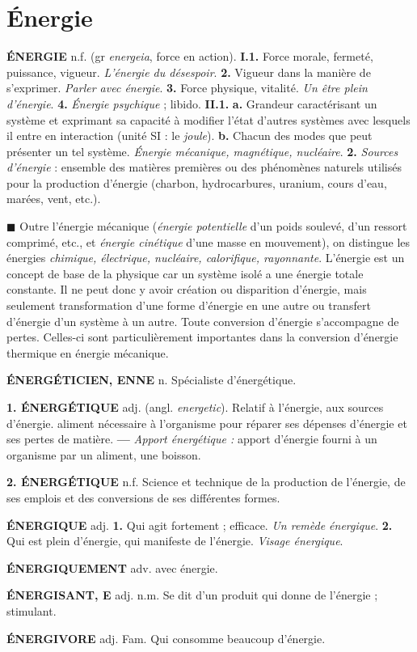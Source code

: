 \section{Énergie}

{\bf ÉNERGIE} {\sf n.f.} (gr {\it energeia}, force en action). {\bf I.1.} Force morale, fermeté, puissance, vigueur. {\it L'énergie du désespoir}. {\bf 2.} Vigueur dans la manière de s'exprimer. {\it Parler avec énergie}. {\bf 3.} Force physique, vitalité. {\it Un être plein d'énergie}. {\bf 4.}  {\it Énergie psychique} ; libido. {\bf II.1.}  {\bf a.} Grandeur caractérisant un système et exprimant sa capacité à modifier l'état d'autres systèmes avec lesquels il entre en interaction (unité SI : le {\it joule}). {\bf b.} Chacun des modes que peut présenter un tel système. {\it Énergie mécanique, magnétique, nucléaire}. {\bf 2.} {\it Sources d'énergie} : ensemble des matières premières ou des phénomènes naturels utilisés pour la production d'énergie (charbon, hydrocarbures, uranium, cours d'eau, marées, vent, etc.).

$\blacksquare$ Outre l'énergie mécanique ({\it énergie potentielle} d'un poids soulevé, d'un ressort comprimé, etc., et {\it énergie cinétique} d'une masse en mouvement), on distingue les énergies {\it chimique, électrique, nucléaire, calorifique, rayonnante}. L'énergie est un concept de base de la physique car un système isolé a une énergie totale constante. Il ne peut donc y avoir création ou disparition d'énergie, mais seulement transformation d'une forme d'énergie en une autre ou transfert d'énergie d'un système à un autre. Toute conversion d'énergie s'accompagne de pertes. Celles-ci sont particulièrement importantes dans la conversion d'énergie thermique en énergie mécanique.

\vspace{0.24cm}
{\footnotesize 
{\bf ÉNERGÉTICIEN, ENNE} {\sf n.} Spécialiste d'énergétique.

{\bf 1. ÉNERGÉTIQUE} {\sf adj.} (angl. {\it energetic}). Relatif à l'énergie, aux sources d'énergie.  aliment nécessaire à l'organisme pour réparer ses dépenses d'énergie et ses pertes de matière. {\bf —} {\it Apport énergétique :} apport d'énergie fourni à un organisme par un aliment, une boisson.

{\bf 2. ÉNERGÉTIQUE} {\sf n.f.} Science et technique de la production de l'énergie, de ses emplois et des conversions de ses différentes formes.

{\bf ÉNERGIQUE} {\sf adj.} {\bf 1.} Qui agit fortement ; efficace. {\it Un remède énergique}. {\bf 2.} Qui est plein d'énergie, qui manifeste de l'énergie. {\it Visage énergique}.

{\bf ÉNERGIQUEMENT} {\sf adv.} avec énergie.

{\bf ÉNERGISANT, E} {\sf adj. n.m.} Se dit d'un produit qui donne de l'énergie ; stimulant.

{\bf ÉNERGIVORE} {\sf adj. Fam.} Qui consomme beaucoup d'énergie.}
\vspace{0.31cm}

